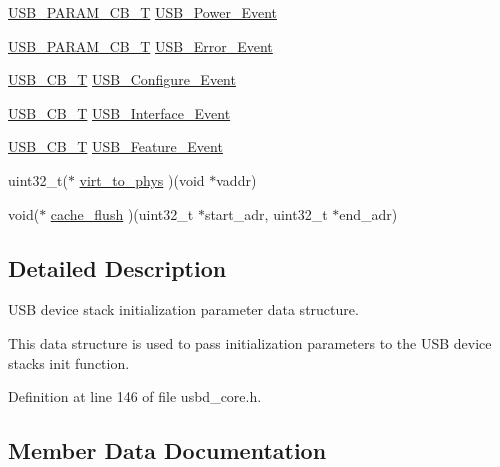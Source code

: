 \begin{DoxyCompactItemize}
\hyperlink{group___u_s_b_d___core_ga7df622c61ebb152b83dd5972ac789b28}{U\+S\+B\+\_\+\+P\+A\+R\+A\+M\+\_\+\+C\+B\+\_\+T} \hyperlink{struct_u_s_b_d___a_p_i___i_n_i_t___p_a_r_a_m_af2aaf61b6e8ada6c2d50b61d516e2db6}{U\+S\+B\+\_\+\+Power\+\_\+\+Event}
\item 
\hyperlink{group___u_s_b_d___core_ga7df622c61ebb152b83dd5972ac789b28}{U\+S\+B\+\_\+\+P\+A\+R\+A\+M\+\_\+\+C\+B\+\_\+T} \hyperlink{struct_u_s_b_d___a_p_i___i_n_i_t___p_a_r_a_m_aff13e98d564c8a0e2356e749a7f9b303}{U\+S\+B\+\_\+\+Error\+\_\+\+Event}
\item 
\hyperlink{group___u_s_b_d___core_ga0404ce046312aa5c798cc4a05c417e46}{U\+S\+B\+\_\+\+C\+B\+\_\+T} \hyperlink{struct_u_s_b_d___a_p_i___i_n_i_t___p_a_r_a_m_ac78477c763bc96613ad5069c84ae3563}{U\+S\+B\+\_\+\+Configure\+\_\+\+Event}
\item 
\hyperlink{group___u_s_b_d___core_ga0404ce046312aa5c798cc4a05c417e46}{U\+S\+B\+\_\+\+C\+B\+\_\+T} \hyperlink{struct_u_s_b_d___a_p_i___i_n_i_t___p_a_r_a_m_a8582d6606f3154437b513800a6bff4c9}{U\+S\+B\+\_\+\+Interface\+\_\+\+Event}
\item 
\hyperlink{group___u_s_b_d___core_ga0404ce046312aa5c798cc4a05c417e46}{U\+S\+B\+\_\+\+C\+B\+\_\+T} \hyperlink{struct_u_s_b_d___a_p_i___i_n_i_t___p_a_r_a_m_a785b92610b9c3430e50123ffd8a0497b}{U\+S\+B\+\_\+\+Feature\+\_\+\+Event}
\item 
uint32\+\_\+t($\ast$ \hyperlink{struct_u_s_b_d___a_p_i___i_n_i_t___p_a_r_a_m_a3f58316f83bb0523073216d80ae35e8d}{virt\+\_\+to\+\_\+phys} )(void $\ast$vaddr)
\item 
void($\ast$ \hyperlink{struct_u_s_b_d___a_p_i___i_n_i_t___p_a_r_a_m_a7cba1a0917ee4ef1d8288db18f907bd4}{cache\+\_\+flush} )(uint32\+\_\+t $\ast$start\+\_\+adr, uint32\+\_\+t $\ast$end\+\_\+adr)
\end{DoxyCompactItemize}


\subsection{Detailed Description}
U\+SB device stack initialization parameter data structure. 

This data structure is used to pass initialization parameters to the U\+SB device stack\textquotesingle{}s init function. 

Definition at line 146 of file usbd\+\_\+core.\+h.



\subsection{Member Data Documentation}
\mbox{\label{struct_u_s_b_d___a_p_i___i_n_i_t___p_a_r_a_m_a7cba1a0917ee4ef1d8288db18f907bd4}} 
